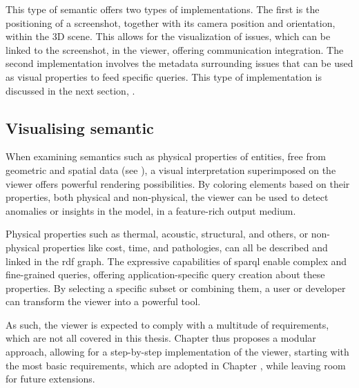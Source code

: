 This type of semantic offers two types of implementations. The first is the positioning of a screenshot, together with its camera position and orientation, within the 3D scene. This allows for the visualization of issues, which can be linked to the screenshot, in the viewer, offering communication integration. The second implementation involves the metadata surrounding issues that can be used as visual properties to feed specific queries. This type of implementation is discussed in the next section, .

\subsection{Visualising semantic} \label{sec:visualSemantic}
When examining semantics such as physical properties of entities, free from geometric and spatial data (see ), a visual interpretation superimposed on the viewer offers powerful rendering possibilities. By coloring elements based on their properties, both physical and non-physical, the viewer can be used to detect anomalies or insights in the model, in a feature-rich output medium.

Physical properties such as thermal, acoustic, structural, and others, or non-physical properties like cost, time, and pathologies, can all be described and linked in the \ac{rdf} graph. The expressive capabilities of \ac{sparql} enable complex and fine-grained queries, offering application-specific query creation about these properties. By selecting a specific subset or combining them, a user or developer can transform the viewer into a powerful tool.

As such, the viewer is expected to comply with a multitude of requirements, which are not all covered in this thesis. Chapter  thus proposes a modular approach, allowing for a step-by-step implementation of the viewer, starting with the most basic requirements, which are adopted in Chapter , while leaving room for future extensions. 

